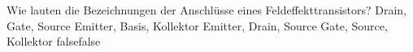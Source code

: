     {Wie lauten die Bezeichnungen der Anschlüsse eines Feldeffekttransistors?}
    {Drain, Gate, Source}
    {Emitter, Basis, Kollektor}
    {Emitter, Drain, Source}
    {Gate, Source, Kollektor}
    {false}{false}